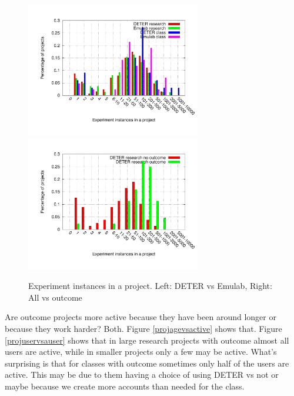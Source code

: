 \begin{figure}[htbp] \begin{center} \includegraphics[width=3in,
type=pdf,ext=.pdf,read=.pdf]{figs/proj.swaps.gnu}
\includegraphics[width=3in,
type=pdf,ext=.pdf,read=.pdf]{figs/proj.swaps.cmp.gnu}
\caption{Experiment instances in a project. Left: DETER vs Emulab,
Right: All vs outcome} \label{projswaps} \end{center} \end{figure}

Are outcome projects more active because they have been around longer or
because they work harder? Both. Figure \ref{projagevsactive} shows that.
Figure \ref{projuservsauser} shows that in large research projects with
outcome almost all users are active, while in smaller projects only a
few may be active. What's surprising is that for classes with outcome
sometimes only half of the users are active. This may be due to them
having a choice of using DETER vs not or maybe because we create more
accounts than needed for the class.

